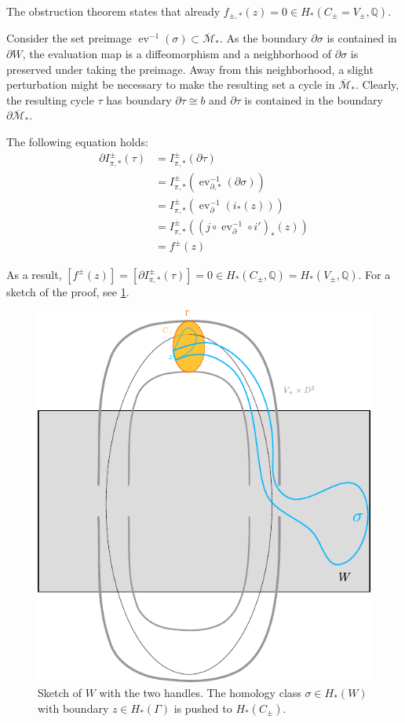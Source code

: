 The obstruction theorem states that already $f_{\pm,*}(z) = 0 \in H_*(C_\pm = V_\pm, \mathbb{Q})$.

Consider the set preimage $\operatorname{ev}^{-1}(\sigma) \subset \overline{\mathcal M}_*$.
As the boundary $\partial \sigma$ is contained in $\partial W$, the evaluation map is a diffeomorphism
and a neighborhood of $\partial \sigma$ is preserved under taking the preimage.
Away from this neighborhood, a slight perturbation might be necessary to make the resulting set a cycle in $\overline{\mathcal M}_*$.
Clearly, the resulting cycle $\tau$ has boundary $\partial \tau \cong b$ and $\partial \tau$ is contained in the boundary $\partial \overline{\mathcal M}_*$.

The following equation holds:
\begin{align*}
    \partial I_{\pi,*}^\pm(\tau) &= I_{\pi,*}^\pm(\partial \tau)\\
    &= I_{\pi, *}^\pm(\operatorname{ev}_{\partial, *}^{-1}(\partial \sigma))\\
    &= I_{\pi, *}^\pm(\operatorname{ev}_\partial^{-1}(i_*(z)))\\
    &= I_{\pi, *}^\pm\left((j \circ \operatorname{ev}_\partial^{-1} \circ i')_*(z)\right)\\
    &= f^\pm(z)
\end{align*}

As a result, $\left[f^\pm(z)\right] = \left[\partial I_{\pi,*}^\pm(\tau)\right] = 0 \in H_*(C_\pm, \mathbb Q) = H_*(V_\pm, \mathbb Q)$.
For a sketch of the proof, see \cref{fig:obstruction_proof_sketch}.

\begin{figure}
    \includegraphics{../images/obstruction_proof_sketch.pdf}
    \caption{Sketch of $W$ with the two handles. The homology class $\sigma \in H_*(W)$ with boundary $z \in H_*(\Gamma)$ is pushed to $H_*(C_\pm)$.}
    \label{fig:obstruction_proof_sketch}
\end{figure}